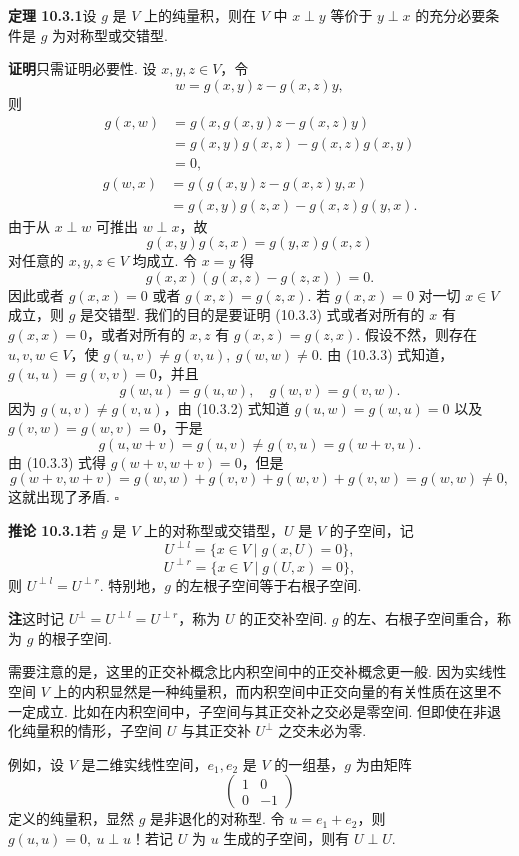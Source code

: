 \documentclass[UTF8, 12pt, fontset=fandol, oneside]{ctexart}
\begin{document}
\noindent\textbf{定理 10.3.1}\quad 设 $g$ 是 $V$ 上的纯量积，则在 $V$ 中 $x\perp y$ 等价于 $y\perp x$ 的充分必要条件是 $g$ 为对称型或交错型.

\noindent\textbf{证明}\quad 只需证明必要性. 设 $x,y,z\in V$，令
\[
  w=g(x,y)z-g(x,z)y,
\]
则
\[
\begin{aligned}
  g(x,w)&=g(x,g(x,y)z-g(x,z)y)\\
  &=g(x,y)g(x,z)-g(x,z)g(x,y)\\
  &=0,
\end{aligned}
\]
\[
\begin{aligned}
  g(w,x)&=g(g(x,y)z-g(x,z)y,x)\\
  &=g(x,y)g(z,x)-g(x,z)g(y,x).
\end{aligned}
\]
由于从 $x\perp w$ 可推出 $w\perp x$，故
\begin{equation}
  g(x,y)g(z,x)=g(y,x)g(x,z)
  \tag{10.3.2}
\end{equation}
对任意的 $x,y,z\in V$ 均成立. 令 $x=y$ 得
\begin{equation}
  g(x,x)(g(x,z)-g(z,x))=0.
  \tag{10.3.3}
\end{equation}
因此或者 $g(x,x)=0$ 或者 $g(x,z)=g(z,x)$. 若 $g(x,x)=0$ 对一切 $x\in V$ 成立，则 $g$ 是交错型. 我们的目的是要证明 (10.3.3) 式或者对所有的 $x$ 有 $g(x,x)=0$，或者对所有的 $x,z$ 有 $g(x,z)=g(z,x)$. 假设不然，则存在 $u,v,w\in V$，使 $g(u,v)\ne g(v,u),\ g(w,w)\ne0$. 由 (10.3.3) 式知道，$g(u,u)=g(v,v)=0$，并且
\[
  g(w,u)=g(u,w),\quad g(w,v)=g(v,w).
\]
因为 $g(u,v)\ne g(v,u)$，由 (10.3.2) 式知道 $g(u,w)=g(w,u)=0$ 以及 $g(v,w)=g(w,v)=0$，于是
\[
  g(u,w+v)=g(u,v)\ne g(v,u)=g(w+v,u).
\]
由 (10.3.3) 式得 $g(w+v,w+v)=0$，但是
\[
  g(w+v,w+v)=g(w,w)+g(v,v)+g(w,v)+g(v,w)=g(w,w)\ne0,
\]
这就出现了矛盾. $\square$

\noindent\textbf{推论 10.3.1}\quad 若 $g$ 是 $V$ 上的对称型或交错型，$U$ 是 $V$ 的子空间，记
\[
  U^{\perp l}=\{x\in V\mid g(x,U)=0\},
\]
\[
  U^{\perp r}=\{x\in V\mid g(U,x)=0\},
\]
则 $U^{\perp l}=U^{\perp r}$. 特别地，$g$ 的左根子空间等于右根子空间.

\noindent\textbf{注}\quad 这时记 $U^\perp=U^{\perp l}=U^{\perp r}$，称为 $U$ 的正交补空间. $g$ 的左、右根子空间重合，称为 $g$ 的根子空间.

需要注意的是，这里的正交补概念比内积空间中的正交补概念更一般. 因为实线性空间 $V$ 上的内积显然是一种纯量积，而内积空间中正交向量的有关性质在这里不一定成立. 比如在内积空间中，子空间与其正交补之交必是零空间. 但即使在非退化纯量积的情形，子空间 $U$ 与其正交补 $U^\perp$ 之交未必为零.

例如，设 $V$ 是二维实线性空间，$e_1,e_2$ 是 $V$ 的一组基，$g$ 为由矩阵
\[
  \left(\begin{array}{cc}
  1&0\\
  0&-1
  \end{array}\right)
\]
定义的纯量积，显然 $g$ 是非退化的对称型. 令 $u=e_1+e_2$，则 $g(u,u)=0,\ u\perp u$！若记 $U$ 为 $u$ 生成的子空间，则有 $U\perp U$.
\end{document}
